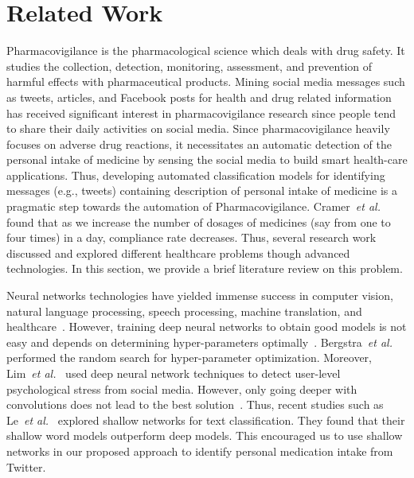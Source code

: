 \section{Related Work}

Pharmacovigilance is the pharmacological science which deals with drug safety. It studies
the collection, detection, monitoring, assessment, and prevention of harmful effects with
pharmaceutical products. Mining social media messages such as tweets, articles, and Facebook
posts for health and drug related information has received significant interest in
pharmacovigilance research since people tend to share their daily activities on social media.
Since pharmacovigilance heavily focuses on adverse drug reactions, it necessitates an automatic
detection of the personal intake of medicine by sensing the social media to build smart
health-care applications. Thus, developing automated classification models for identifying
messages (e.g., tweets) containing description of personal intake of medicine is a pragmatic
step towards the automation of Pharmacovigilance. Cramer~\emph{et al.}~\cite{cramer1989often} 
found that as we increase the number of dosages of medicines (say from one to four times) in 
a day, compliance rate decreases. Thus, several research work~\cite{harmark2008pharmacovigilance, saparova2012motivating, cambria2012sentic} 
discussed and explored different healthcare problems though advanced technologies. 
In this section, we provide a brief literature review on this problem.

Neural networks technologies have yielded immense success in computer vision, natural 
language processing, speech processing, machine translation, and 
healthcare~\cite{kim2014convolutional, liang2014deep, shin2016lexicon, denkowski2017stronger}. 
However, training deep neural networks to obtain good models is not easy and depends on 
determining hyper-parameters optimally~\cite{glorot2010understanding}. 
Bergstra~\emph{et al.}~\cite{bergstra2012random} performed the random search for hyper-parameter 
optimization. Moreover, Lim~\emph{et al.}~\cite{lin2014user} used deep neural network 
techniques to detect user-level psychological stress from social media. However, only
going deeper with convolutions does not lead to the best solution~\cite{szegedy2015going}. 
Thus, recent studies such as Le~\emph{et al.}~\cite{le2017convolutional} explored 
shallow networks for text classification. They found that their shallow word models outperform 
deep models. This encouraged us to use shallow networks in our proposed approach 
to identify personal medication intake from Twitter.

